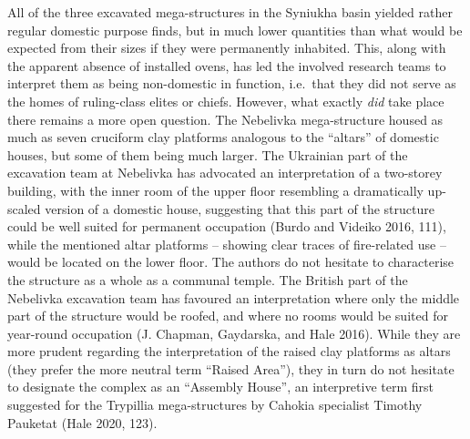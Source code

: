 \documentclass[
  12pt,
  a4paper, twoside]{book}
\begin{document}
All of the three excavated mega-structures in the Syniukha basin yielded rather regular domestic purpose finds, but in much lower quantities than what would be expected from their sizes if they were permanently inhabited. This, along with the apparent absence of installed ovens, has led the involved research teams to interpret them as being non-domestic in function, i.e.~that they did not serve as the homes of ruling-class elites or chiefs. However, what exactly \emph{did} take place there remains a more open question. The Nebelivka mega-structure housed as much as seven cruciform clay platforms analogous to the ``altars'' of domestic houses, but some of them being much larger. The Ukrainian part of the excavation team at Nebelivka has advocated an interpretation of a two-storey building, with the inner room of the upper floor resembling a dramatically up-scaled version of a domestic house, suggesting that this part of the structure could be well suited for permanent occupation (Burdo and Videiko 2016, 111), while the mentioned altar platforms -- showing clear traces of fire-related use -- would be located on the lower floor. The authors do not hesitate to characterise the structure as a whole as a communal temple. The British part of the Nebelivka excavation team has favoured an interpretation where only the middle part of the structure would be roofed, and where no rooms would be suited for year-round occupation (J. Chapman, Gaydarska, and Hale 2016). While they are more prudent regarding the interpretation of the raised clay platforms as altars (they prefer the more neutral term ``Raised Area''), they in turn do not hesitate to designate the complex as an ``Assembly House'', an interpretive term first suggested for the Trypillia mega-structures by Cahokia specialist Timothy Pauketat (Hale 2020, 123).
\end{document}
